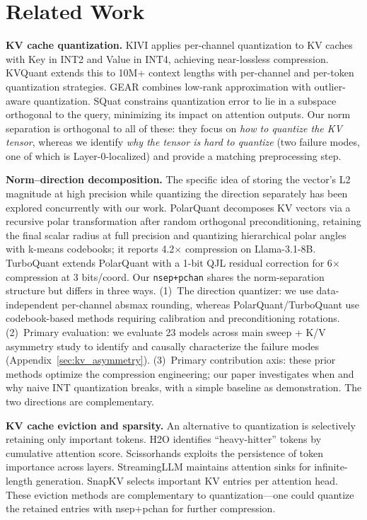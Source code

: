 \documentclass[11pt]{article}
\begin{document}
\section{Related Work}

\textbf{KV cache quantization.}
KIVI \citep{liu2024kivi} applies per-channel quantization to KV caches with Key in INT2 and Value in INT4, achieving near-lossless compression. KVQuant \citep{hooper2024kvquant} extends this to 10M+ context lengths with per-channel and per-token quantization strategies. GEAR \citep{kang2024gear} combines low-rank approximation with outlier-aware quantization. SQuat \citep{dong2025squat} constrains quantization error to lie in a subspace orthogonal to the query, minimizing its impact on attention outputs. Our norm separation is orthogonal to all of these: they focus on \emph{how to quantize the KV tensor}, whereas we identify \emph{why the tensor is hard to quantize} (two failure modes, one of which is Layer-0-localized) and provide a matching preprocessing step.

\textbf{Norm--direction decomposition.}
The specific idea of storing the vector's L2 magnitude at high precision while quantizing the direction separately has been explored concurrently with our work. PolarQuant \citep{han2025polarquant} decomposes KV vectors via a recursive polar transformation after random orthogonal preconditioning, retaining the final scalar radius at full precision and quantizing hierarchical polar angles with k-means codebooks; it reports 4.2$\times$ compression on Llama-3.1-8B. TurboQuant \citep{cherapanamjeri2026turboquant} extends PolarQuant with a 1-bit QJL residual correction for 6$\times$ compression at 3 bits/coord. Our \texttt{nsep+pchan} shares the norm-separation structure but differs in three ways. (1)~The direction quantizer: we use data-independent per-channel absmax rounding, whereas PolarQuant/TurboQuant use codebook-based methods requiring calibration and preconditioning rotations. (2)~Primary evaluation: we evaluate 23 models across main sweep + K/V asymmetry study to identify and causally characterize the failure modes (Appendix~\ref{sec:kv_asymmetry}). (3)~Primary contribution axis: these prior methods optimize the compression engineering; our paper investigates when and why naive INT quantization breaks, with a simple baseline as demonstration. The two directions are complementary.

\textbf{KV cache eviction and sparsity.}
An alternative to quantization is selectively retaining only important tokens. H2O \citep{zhang2023h2o} identifies ``heavy-hitter'' tokens by cumulative attention score. Scissorhands \citep{liu2023scissorhands} exploits the persistence of token importance across layers. StreamingLLM \citep{xiao2024streaming} maintains attention sinks for infinite-length generation. SnapKV \citep{li2024snapkv} selects important KV entries per attention head. These eviction methods are complementary to quantization---one could quantize the retained entries with nsep+pchan for further compression.
\end{document}
